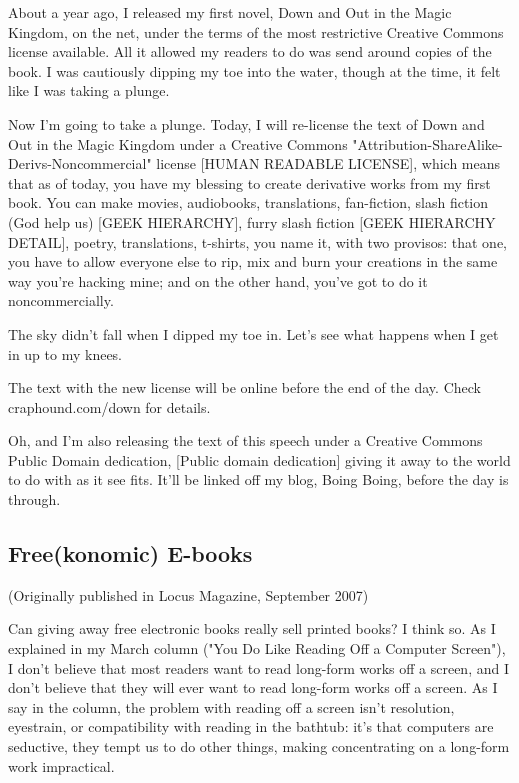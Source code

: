 About a year ago, I released my first novel, Down and Out in the
Magic Kingdom, on the net, under the terms of the most restrictive
Creative Commons license available. All it allowed my readers to do
was send around copies of the book. I was cautiously dipping my toe
into the water, though at the time, it felt like I was taking a
plunge.

Now I'm going to take a plunge. Today, I will re-license the text
of Down and Out in the Magic Kingdom under a Creative Commons
"Attribution-ShareAlike-Derivs-Noncommercial" license [HUMAN
READABLE LICENSE], which means that as of today, you have my
blessing to create derivative works from my first book. You can
make movies, audiobooks, translations, fan-fiction, slash fiction
(God help us) [GEEK HIERARCHY], furry slash fiction [GEEK HIERARCHY
DETAIL], poetry, translations, t-shirts, you name it, with two
provisos: that one, you have to allow everyone else to rip, mix and
burn your creations in the same way you're hacking mine; and on the
other hand, you've got to do it noncommercially.

The sky didn't fall when I dipped my toe in. Let's see what happens
when I get in up to my knees.

The text with the new license will be online before the end of the
day. Check craphound.com/down for details.

Oh, and I'm also releasing the text of this speech under a Creative
Commons Public Domain dedication, [Public domain dedication] giving
it away to the world to do with as it see fits. It'll be linked off
my blog, Boing Boing, before the day is through.

\subsection{Free(konomic) E-books}

(Originally published in Locus Magazine, September 2007)

Can giving away free electronic books really sell printed books? I
think so. As I explained in my March column ("You Do Like Reading
Off a Computer Screen"), I don't believe that most readers want to
read long-form works off a screen, and I don't believe that they
will ever want to read long-form works off a screen. As I say in
the column, the problem with reading off a screen isn't resolution,
eyestrain, or compatibility with reading in the bathtub: it's that
computers are seductive, they tempt us to do other things, making
concentrating on a long-form work impractical.

